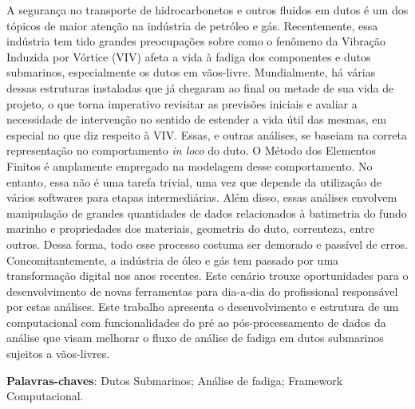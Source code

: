 
\setlength{\absparsep}{18pt} %
\begin{resumo}

    A segurança no transporte de hidrocarbonetos e outros fluidos em dutos é um dos tópicos de maior atenção na indústria de petróleo e gás.
    Recentemente, essa indústria tem tido grandes preocupações sobre como o fenômeno da Vibração Induzida por Vórtice (VIV) afeta a vida à fadiga dos componentes e dutos submarinos, especialmente os dutos em vãos-livre.
    Mundialmente, há várias dessas estruturas instaladas que já chegaram ao final ou metade de sua vida de projeto, o que torna imperativo revisitar as previsões iniciais e avaliar a necessidade de intervenção no sentido de estender a vida útil das mesmas, em especial no que diz respeito à VIV.
    Essas, e outras análises, se baseiam na correta representação no comportamento \textit{in loco} do duto.
    O Método dos Elementos Finitos é amplamente empregado na modelagem desse comportamento.
    No entanto, essa não é uma tarefa trivial, uma vez que depende da utilização de vários softwares para etapas intermediárias.
    Além disso, essas análises envolvem manipulação de grandes quantidades de dados relacionados à batimetria do fundo marinho e propriedades dos materiais, geometria do duto, correnteza, entre outros.
    Dessa forma, todo esse processo costuma ser demorado e passível de erros.
    Concomitantemente, a indústria de óleo e gás tem passado por uma transformação digital nos anos recentes.
    Este cenário trouxe oportunidades para o desenvolvimento de novas ferramentas para dia-a-dia do profissional responsável por estas análises.
    Este trabalho apresenta o desenvolvimento e estrutura de um \frame computacional com funcionalidades do pré ao pós-processamento de dados da análise que visam melhorar o fluxo de análise de fadiga em dutos submarinos sujeitos a vãos-livres.

 \textbf{Palavras-chaves}: Dutos Submarinos; Análise de fadiga; Framework Computacional.
\end{resumo}

